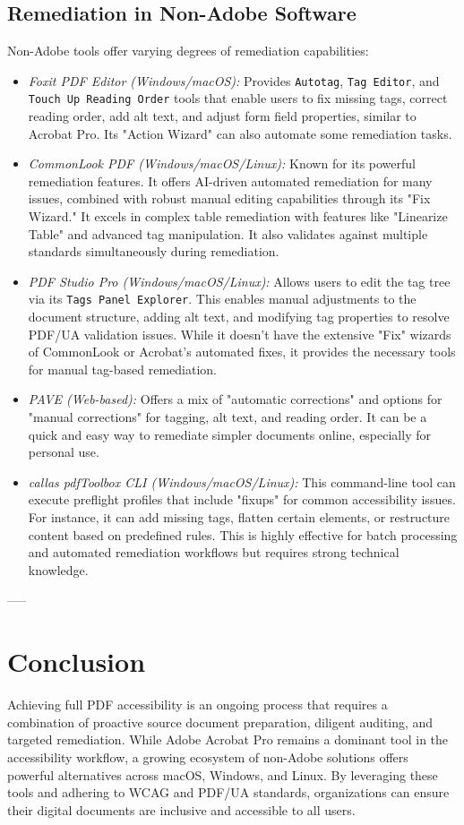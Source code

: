 \subsection{Remediation in Non-Adobe Software}
\label{subsec:remediation-non-adobe}
Non-Adobe tools offer varying degrees of remediation capabilities:
\begin{itemize}
\item \emph{Foxit PDF Editor (Windows/macOS):} Provides \texttt{Autotag}, \texttt{Tag Editor}, and \texttt{Touch Up Reading Order} tools that enable users to fix missing tags, correct reading order, add alt text, and adjust form field properties, similar to Acrobat Pro. Its "Action Wizard" can also automate some remediation tasks.
\item \emph{CommonLook PDF (Windows/macOS/Linux):} Known for its powerful remediation features. It offers AI-driven automated remediation for many issues, combined with robust manual editing capabilities through its "Fix Wizard." It excels in complex table remediation with features like "Linearize Table" and advanced tag manipulation. It also validates against multiple standards simultaneously during remediation.
\item \emph{PDF Studio Pro (Windows/macOS/Linux):} Allows users to edit the tag tree via its \texttt{Tags Panel Explorer}. This enables manual adjustments to the document structure, adding alt text, and modifying tag properties to resolve PDF/UA validation issues. While it doesn't have the extensive "Fix" wizards of CommonLook or Acrobat's automated fixes, it provides the necessary tools for manual tag-based remediation.
\item \emph{PAVE (Web-based):} Offers a mix of "automatic corrections" and options for "manual corrections" for tagging, alt text, and reading order. It can be a quick and easy way to remediate simpler documents online, especially for personal use.
\item \emph{callas pdfToolbox CLI (Windows/macOS/Linux):} This command-line tool can execute preflight profiles that include "fixups" for common accessibility issues. For instance, it can add missing tags, flatten certain elements, or restructure content based on predefined rules. This is highly effective for batch processing and automated remediation workflows but requires strong technical knowledge.
\end{itemize}

-----

\section{Conclusion}
\label{sec:conclusion}
Achieving full PDF accessibility is an ongoing process that requires a combination of proactive source document preparation, diligent auditing, and targeted remediation. While Adobe Acrobat Pro remains a dominant tool in the accessibility workflow, a growing ecosystem of non-Adobe solutions offers powerful alternatives across macOS, Windows, and Linux. By leveraging these tools and adhering to WCAG and PDF/UA standards, organizations can ensure their digital documents are inclusive and accessible to all users.

